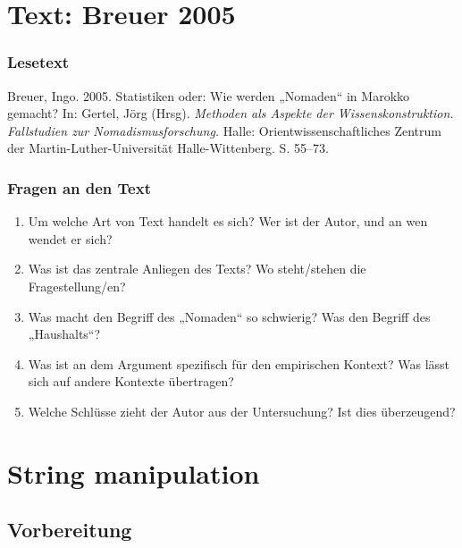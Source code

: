 \documentclass[
  ngerman,
]{article}
\providecommand{\tightlist}{%
  \setlength{\itemsep}{0pt}\setlength{\parskip}{0pt}}
\begin{document}
\hypertarget{text-breuer-2005}{%
\section{Text: Breuer 2005}\label{text-breuer-2005}}

\hypertarget{lesetext-3}{%
\subsubsection{Lesetext}\label{lesetext-3}}

Breuer, Ingo. 2005. Statistiken oder: Wie werden „Nomaden`` in Marokko gemacht? In: Gertel, Jörg (Hrsg). \emph{Methoden als Aspekte der Wissenskonstruktion. Fallstudien zur Nomadismusforschung.} Halle: Orientwissenschaftliches Zentrum der Martin-Luther-Universität Halle-Wittenberg. S. 55--73.

\hypertarget{fragen-an-den-text-4}{%
\subsubsection{Fragen an den Text}\label{fragen-an-den-text-4}}

\begin{enumerate}
\def\labelenumi{\arabic{enumi}.}
\tightlist
\item
  Um welche Art von Text handelt es sich? Wer ist der Autor, und an wen wendet er sich?
\item
  Was ist das zentrale Anliegen des Texts? Wo steht/stehen die Fragestellung/en?
\item
  Was macht den Begriff des „Nomaden`` so schwierig? Was den Begriff des „Haushalts``?
\item
  Was ist an dem Argument spezifisch für den empirischen Kontext? Was lässt sich auf andere Kontexte übertragen?
\item
  Welche Schlüsse zieht der Autor aus der Untersuchung? Ist dies überzeugend?
\end{enumerate}

\hypertarget{string-manipulation}{%
\section{String manipulation}\label{string-manipulation}}

\hypertarget{vorbereitung-6}{%
\subsection{Vorbereitung}\label{vorbereitung-6}}
\end{document}
